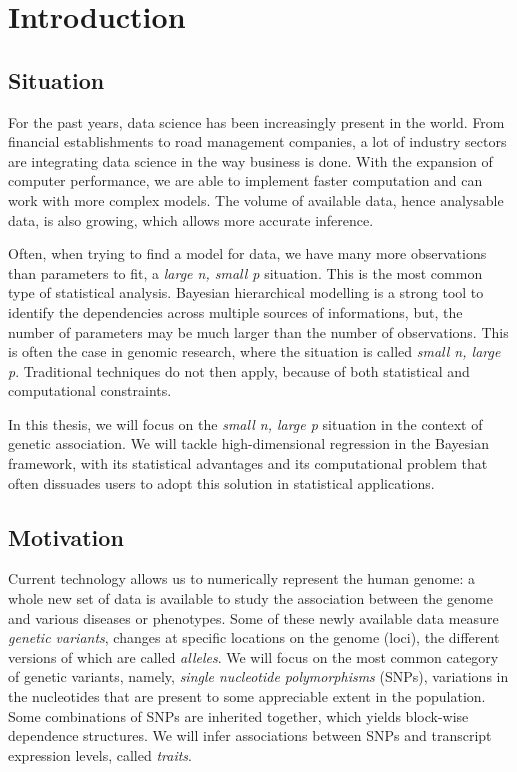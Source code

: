 \documentclass[a4paper, 11pt]{report}
\numberwithin{equation}{chapter}
\begin{document}
\chapter{Introduction}
\section{Situation}
For the past years, data science has been increasingly present in the world. From financial establishments to road management companies, a lot of industry sectors are integrating data science in the way business is done. With the expansion of computer performance, we are able to implement faster computation and can work with more complex models. The volume of available data, hence analysable data, is also growing, which allows more accurate inference.

Often, when trying to find a model for data, we have many more observations than parameters to fit, a \textit{large n, small p} situation. This is the most common type of statistical analysis. Bayesian hierarchical modelling is a strong tool to identify the dependencies across multiple sources of informations, but, the number of parameters may be much larger than the number of observations. This is often the case in genomic research, where the situation is called \textit{small n, large p}. Traditional techniques do not then apply, because of both statistical and computational constraints.

In this thesis, we will focus on the \textit{small n, large p} situation in the context of genetic association. We will tackle high-dimensional regression in the Bayesian framework, with its statistical advantages and its computational problem that often dissuades users to adopt this solution in statistical applications.

\section{Motivation}
Current technology allows us to numerically represent the human genome: a whole new set of data is available to study the association between the genome and various diseases or phenotypes.  Some of these newly available data measure \textit{genetic variants}, changes at specific locations on  the genome (loci), the different versions of which are called \textit{alleles}. We will focus on the most common category of genetic variants, namely, \textit{single nucleotide polymorphisms} (SNPs), variations in the nucleotides that are present to some appreciable extent in the population. Some combinations of SNPs are inherited together, which yields block-wise dependence structures. We will infer associations between SNPs and transcript expression levels, called \textit{traits}.
\end{document}
